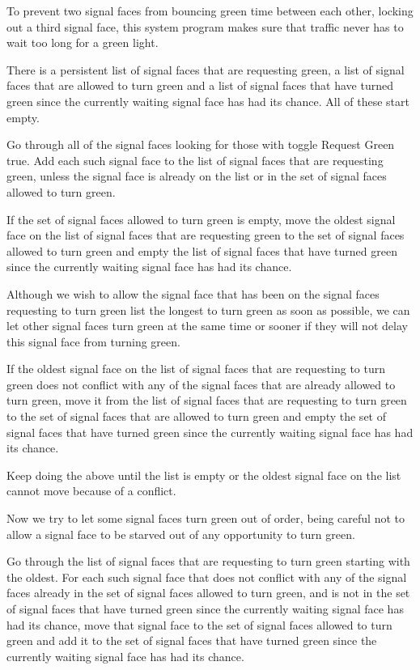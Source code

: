 \documentclass[letterpaper,twoside]{article}
\begin{document}
To prevent two signal faces from bouncing green time between each other,
locking out a third signal face, this system program makes sure that
traffic never has to wait too long for a green light.

There is a persistent list of signal faces that are requesting green,
a list of signal faces that are allowed to turn green and a list of signal
faces that have turned green since the currently waiting signal face
has had its chance.
All of these start empty.

Go through all of the signal faces looking for those with toggle Request
Green true.  Add each such signal face to the list of
signal faces that are requesting green, unless the signal face is already on
the list or in the set of signal faces allowed to turn green.

If the set of signal faces allowed to turn green is empty, move the
oldest signal face on the list of signal faces that are requesting
green to the set of signal faces allowed to turn green and empty the list
of signal faces that have turned green since the currently waiting
signal face has had its chance.

Although we wish to allow the signal face that has been on the
signal faces requesting to turn green list the longest to turn green
as soon as possible, we can let other signal faces turn green
at the same time or sooner if they will not delay this signal face
from turning green.

If the oldest signal face on the list of signal faces that are
requesting to turn green does not conflict with any of the signal
faces that are already allowed to turn green, move it from the
list of signal faces that are requesting to turn green to the set
of signal faces that are allowed to turn green and empty the set
of signal faces that have turned green since the currently waiting
signal face has had its chance.

Keep doing the above until the list is empty or the oldest signal
face on the list cannot move because of a conflict.

Now we try to let some signal faces turn green out of order, being
careful not to allow a signal face to be starved out of any
opportunity to turn green.

Go through the list of signal faces that are requesting to turn green
starting with the oldest.  For each such signal face that does not
conflict with any of the signal faces already in the set of signal
faces allowed to turn green, and is not in the set of signal faces
that have turned green since the currently waiting signal face has
had its chance, move that signal face to the set of signal faces
allowed to turn green and add it to the set of signal faces that have
turned green since the currently waiting signal face has had its
chance.
\end{document}
